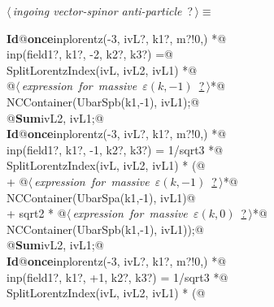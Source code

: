 \documentclass[a4paper,12pt]{amsart}
\renewcommand{\NWtarget}[2]{\hypertarget{#1}{#2}}
\renewcommand{\NWlink}[2]{\hyperlink{#1}{#2}}
\begin{document}
\begin{flushleft} \small
\begin{minipage}{\linewidth}\label{scrap34}\raggedright\small
\NWtarget{nuweb?}{} $\langle\,${\it ingoing vector-spinor anti-particle}\nobreak\ {\footnotesize {?}}$\,\rangle\equiv$
\vspace{-1ex}
\begin{list}{}{} \item
\mbox{}\verb@@\hbox{\sffamily\bfseries Id}\verb@ @\hbox{\sffamily\bfseries once}\verb@ inplorentz(-3, ivL?, k1?, m?!{0,}) *@\\
\mbox{}\verb@      inp(field1?, k1?, -2, k2?, k3?) =@\\
\mbox{}\verb@   SplitLorentzIndex(ivL, ivL2, ivL1) *@\\
\mbox{}\verb@   @\hbox{$\langle\,${\it expression for massive $\varepsilon(k, -1)$}\nobreak\ {\footnotesize \NWlink{nuweb?}{?}}$\,\rangle$}\verb@ *@\\
\mbox{}\verb@   NCContainer(UbarSpb(k1,-1), ivL1);@\\
\mbox{}\verb@   @\hbox{\sffamily\bfseries Sum}\verb@ ivL2, ivL1;@\\
\mbox{}\verb@@\hbox{\sffamily\bfseries Id}\verb@ @\hbox{\sffamily\bfseries once}\verb@ inplorentz(-3, ivL?, k1?, m?!{0,}) *@\\
\mbox{}\verb@      inp(field1?, k1?, -1, k2?, k3?) = 1/sqrt3 *@\\
\mbox{}\verb@   SplitLorentzIndex(ivL, ivL2, ivL1) * (@\\
\mbox{}\verb@   + @\hbox{$\langle\,${\it expression for massive $\varepsilon(k, -1)$}\nobreak\ {\footnotesize \NWlink{nuweb?}{?}}$\,\rangle$}\verb@ *@\\
\mbox{}\verb@     NCContainer(UbarSpa(k1,-1), ivL1)@\\
\mbox{}\verb@   + sqrt2 * @\hbox{$\langle\,${\it expression for massive $\varepsilon(k, 0)$}\nobreak\ {\footnotesize \NWlink{nuweb?}{?}}$\,\rangle$}\verb@ *@\\
\mbox{}\verb@     NCContainer(UbarSpb(k1,-1), ivL1));@\\
\mbox{}\verb@   @\hbox{\sffamily\bfseries Sum}\verb@ ivL2, ivL1;@\\
\mbox{}\verb@@\hbox{\sffamily\bfseries Id}\verb@ @\hbox{\sffamily\bfseries once}\verb@ inplorentz(-3, ivL?, k1?, m?!{0,}) *@\\
\mbox{}\verb@      inp(field1?, k1?, +1, k2?, k3?) = 1/sqrt3 *@\\
\mbox{}\verb@   SplitLorentzIndex(ivL, ivL2, ivL1) * (@\\

\end{list}
\end{minipage}
\end{flushleft}
\end{document}
